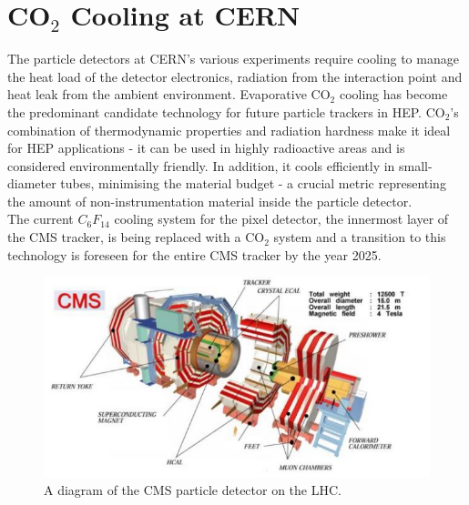 \documentclass{report}
\begin{document}
\section{CO\texorpdfstring{$_2$}{TEXT} Cooling at CERN}
The particle detectors at CERN's various experiments require cooling to manage the heat load of the detector electronics, radiation from the interaction point and heat leak from the ambient environment. Evaporative CO$_2$ cooling has become the predominant candidate technology for future particle trackers in HEP.\cite{mishra} CO$_2$'s combination of thermodynamic properties and radiation hardness make it ideal for HEP applications - it can be used in highly radioactive areas and is considered environmentally friendly. In addition, it cools efficiently in small-diameter tubes, minimising the material budget - a crucial metric representing the amount of non-instrumentation material inside the particle detector. \cite{jerome} \\The current $C_6F_14$ cooling system for the pixel detector, the innermost layer of the CMS tracker, is  being replaced with a CO$_2$ system and a transition to this technology is foreseen for the entire CMS tracker by the year 2025.

\begin{figure}[h!]
\includegraphics[width=\textwidth]{figures/CMS.jpg}
\caption{A diagram of the CMS particle detector on the LHC. \cite{mishra}}
\label{fig: cms}
\end{figure}	
\FloatBarrier
\end{document}
